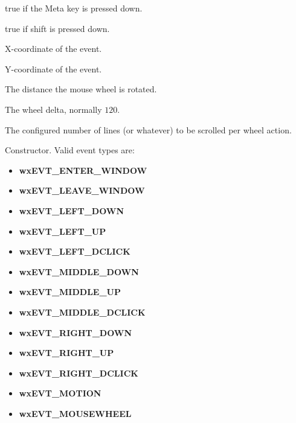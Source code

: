 
true if the Meta key is pressed down.



true if shift is pressed down.



X-coordinate of the event.



Y-coordinate of the event.



The distance the mouse wheel is rotated.



The wheel delta, normally $120$.



The configured number of lines (or whatever) to be scrolled per wheel
action.




Constructor. Valid event types are:

\begin{itemize}
\itemsep=0pt
\item {\bf wxEVT\_ENTER\_WINDOW}
\item {\bf wxEVT\_LEAVE\_WINDOW}
\item {\bf wxEVT\_LEFT\_DOWN}
\item {\bf wxEVT\_LEFT\_UP}
\item {\bf wxEVT\_LEFT\_DCLICK}
\item {\bf wxEVT\_MIDDLE\_DOWN}
\item {\bf wxEVT\_MIDDLE\_UP}
\item {\bf wxEVT\_MIDDLE\_DCLICK}
\item {\bf wxEVT\_RIGHT\_DOWN}
\item {\bf wxEVT\_RIGHT\_UP}
\item {\bf wxEVT\_RIGHT\_DCLICK}
\item {\bf wxEVT\_MOTION}
\item {\bf wxEVT\_MOUSEWHEEL}
\end{itemize}

